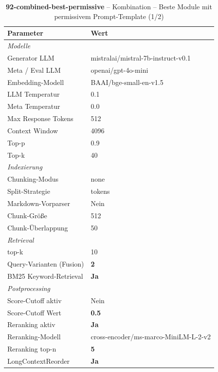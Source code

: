 \begin{table}[H]
\centering
\small
\setlength{\tabcolsep}{4pt}
\begin{tabular}{lp{8cm}}
\toprule
\textbf{Parameter} & \textbf{Wert} \\
\midrule
\multicolumn{2}{l}{\textit{Modelle}} \\
\midrule
\quad Generator LLM & mistralai/mistral-7b-instruct-v0.1 \\
\quad Meta / Eval LLM & openai/gpt-4o-mini \\
\quad Embedding-Modell & BAAI/bge-small-en-v1.5 \\
\quad LLM Temperatur & 0.1 \\
\quad Meta Temperatur & 0.0 \\
\quad Max Response Tokens & 512 \\
\quad Context Window & 4096 \\
\quad Top-p & 0.9 \\
\quad Top-k & 40 \\
\midrule
\multicolumn{2}{l}{\textit{Indexierung}} \\
\midrule
\quad Chunking-Modus & none \\
\quad Split-Strategie & tokens \\
\quad Markdown-Vorparser & Nein \\
\quad Chunk-Größe & 512 \\
\quad Chunk-Überlappung & 50 \\
\midrule
\multicolumn{2}{l}{\textit{Retrieval}} \\
\midrule
\quad top-k & 10 \\
\quad Query-Varianten (Fusion) & \textbf{2} \\
\quad BM25 Keyword-Retrieval & \textbf{Ja} \\
\midrule
\multicolumn{2}{l}{\textit{Postprocessing}} \\
\midrule
\quad Score-Cutoff aktiv & Nein \\
\quad Score-Cutoff Wert & \textbf{0.5} \\
\quad Reranking aktiv & \textbf{Ja} \\
\quad Reranking-Modell & cross-encoder/ms-marco-MiniLM-L-2-v2 \\
\quad Reranking top-n & \textbf{5} \\
\quad LongContextReorder & \textbf{Ja} \\
\bottomrule
\end{tabular}
\caption{\textbf{92-combined-best-permissive} -- Kombination -- Beste Module mit permissivem Prompt-Template (1/2)}
\label{tab:config_92_combined_best_permissive_a}
\end{table}

